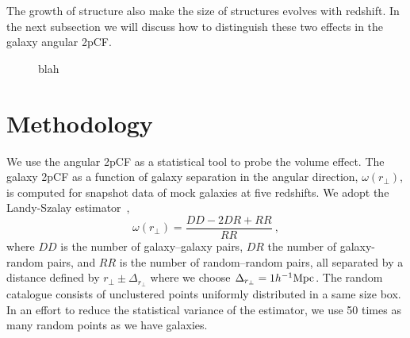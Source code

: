 \documentclass[iop]{emulateapj}
\begin{document}

The growth of structure also make the size of structures evolves with redshift.
In the next subsection we will discuss how to distinguish these two effects in the galaxy angular 2pCF.

\begin{figure}
   \caption{\label{fig_scatter}
  blah
   }
\end{figure}

\section{Methodology}


We use the angular 2pCF as a statistical tool to probe the volume effect.
The galaxy 2pCF as a function of galaxy separation in the angular direction, $\omega(r_\perp)$, is computed for snapshot data of mock galaxies at five redshifts.
We adopt the Landy-Szalay estimator~\citep{1993ApJ...412...64L},
\begin{equation}
\omega(r_\perp)=\frac{DD-2DR+RR}{RR}\ ,
\end{equation}
where $DD$ is the number of galaxy--galaxy pairs, 
$DR$ the number of galaxy-random pairs, 
and $RR$ is the number of random--random pairs, 
all separated by a distance defined by $r_\perp\pm\Delta_{r_\perp}$ where we choose $\Delta_{r_\perp}=1h^{-1}\rm Mpc$.
The random catalogue consists of unclustered points uniformly distributed in a same size box. 
In an effort to reduce the statistical variance of the estimator, we use 50 times as many random points as we have galaxies.
\end{document}
